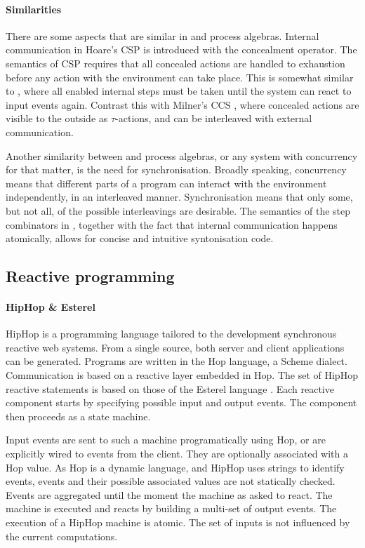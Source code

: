 \paragraph{Similarities}
There are some aspects that are similar in \TOPHAT and process algebras.
Internal communication in Hoare's CSP \cite{books/Hoare85CSP} is introduced with the concealment operator.
The semantics of CSP requires that all concealed actions are handled to exhaustion before any action with the environment can take place.
This is somewhat similar to \TOPHAT, where all enabled internal steps must be taken until the system can react to input events again.
Contrast this with Milner's CCS \cite{books/Milner89CAC}, where concealed actions are visible to the outside as $\tau$-actions, and can be interleaved with external communication.

Another similarity between \TOPHAT and process algebras, or any system with concurrency for that matter, is the need for synchronisation.
Broadly speaking, concurrency means that different parts of a program can interact with the environment independently, in an interleaved manner.
Synchronisation means that only some, but not all, of the possible interleavings are desirable.
The semantics of the step combinators in \TOPHAT, together with the fact that internal communication happens atomically, allows for concise and intuitive syntonisation code.



\subsection{Reactive programming}

\paragraph{HipHop \& Esterel}

HipHop \cite{berry2011hiphop,journals/corr/BerryS13} is a programming language tailored to the development synchronous reactive web systems.
From a single source, both server and client applications can be generated.
Programs are written in the Hop language, a Scheme dialect.
Communication is based on a reactive layer embedded in Hop.
The set of HipHop reactive statements is based on those of the Esterel language \cite{boussinot1991esterel,journals/scp/BerryG92}.
Each reactive component starts by specifying possible input and output events.
The component then proceeds as a state machine.

Input events are sent to such a machine programatically using Hop, or are explicitly wired to events from the client.
They are optionally associated with a Hop value.
As Hop is a dynamic language, and HipHop uses strings to identify events, events and their possible associated values are not statically checked.
Events are aggregated until the moment the machine as asked to react.
The machine is executed and reacts by building a multi-set of output events.
The execution of a HipHop machine is atomic.
The set of inputs is not influenced by the current computations.

